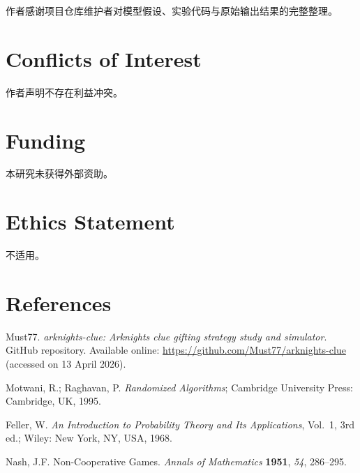 \documentclass{rubbish}
\begin{document}
\begin{rubbishbody}
作者感谢项目仓库维护者对模型假设、实验代码与原始输出结果的完整整理。

\section*{Conflicts of Interest}

作者声明不存在利益冲突。

\section*{Funding}

本研究未获得外部资助。

\section*{Ethics Statement}

不适用。

\section*{References}

\noindent [1] Must77. \textit{arknights-clue: Arknights clue gifting strategy study and simulator}. GitHub repository. Available online: \url{https://github.com/Must77/arknights-clue} (accessed on 13 April 2026).

\medskip

\noindent [2] Motwani, R.; Raghavan, P. \textit{Randomized Algorithms}; Cambridge University Press: Cambridge, UK, 1995.

\medskip

\noindent [3] Feller, W. \textit{An Introduction to Probability Theory and Its Applications}, Vol.~1, 3rd ed.; Wiley: New York, NY, USA, 1968.

\medskip

\noindent [4] Nash, J.F. Non-Cooperative Games. \textit{Annals of Mathematics} \textbf{1951}, \textit{54}, 286--295.

\end{rubbishbody}
\end{document}
